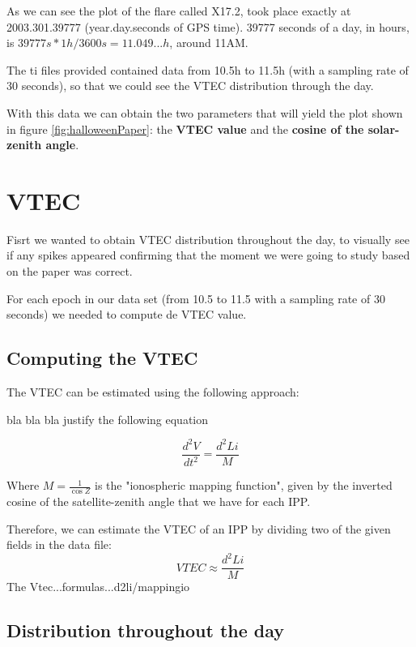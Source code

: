 As we can see the plot of the flare called X17.2, took place exactly at 2003.301.39777 (year.day.seconds of GPS time). 39777 seconds of a day, in hours, is $39777s * 1h/3600s = 11.049...h$, around 11AM. 

The ti files provided contained data from 10.5h to 11.5h (with a sampling rate of 30 seconds), so that we could see the VTEC distribution through the day.

With this data we can obtain the two parameters that will yield the plot shown in figure \ref{fig:halloweenPaper}: the \textbf{VTEC value} and the \textbf{cosine of the solar-zenith angle}.

\section{VTEC}

Fisrt we wanted to obtain VTEC distribution throughout the day, to visually see if any spikes appeared confirming that the moment we were going to study based on the paper \cite{hernandez2012gnss} was correct.

For each epoch in our data set (from 10.5 to 11.5 with a sampling rate of 30 seconds) we needed to compute de VTEC value.

\subsection{Computing the VTEC}

The VTEC can be estimated using the following approach:

bla bla bla justify the following equation

\begin{equation} \label{eq:1}
	\frac{d^{2}V}{dt^{2}} = \frac{d^{2}Li}{M}
\end{equation}

Where $M=\frac{1}{\cos Z}$ is the "ionospheric mapping function", given by the inverted cosine of the satellite-zenith angle that we have for each IPP. \cite{hernandez2012gnss}

Therefore, we can estimate the VTEC of an IPP by dividing two of the given fields in the data file:
\begin{equation} \label{eq:2}
	VTEC \approx \frac{d^{2}Li}{M}
\end{equation}
The Vtec...formulas...d2li/mappingio


\subsection{Distribution throughout the day}

